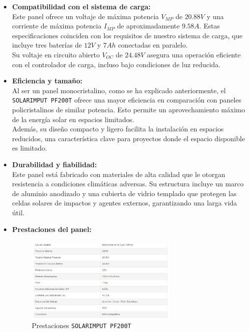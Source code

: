 \begin{itemize}
    \item \textbf{Compatibilidad con el sistema de carga:} \\
    Este panel ofrece un voltaje de máxima potencia $V_{MP}$ de $20.88 V$ y una corriente de máxima potencia $I_{MP}$  de aproximadamente $9.58 A$. Estas especificaciones coinciden con los requisitos de nuestro sistema de carga, que incluye tres baterías de $12 V$ y $7 Ah$ conectadas en paralelo. \\
    Su voltaje en circuito abierto $V_{OC}$  de $24.48 V$ asegura una operación eficiente con el controlador de carga, incluso bajo condiciones de luz reducida.

    \item \textbf{Eficiencia y tamaño:} \\
    Al ser un panel monocristalino, como se ha explicado anteriormente, el \texttt{SOLARIMPUT PF200T} ofrece una mayor eficiencia en comparación con paneles policristalinos de similar potencia. Esto permite un aprovechamiento máximo de la energía solar en espacios limitados.\\
    Además, su diseño compacto y ligero facilita la instalación en espacios reducidos, una característica clave para proyectos donde el espacio disponible es limitado.

    \item \textbf{Durabilidad y fiabilidad:}\\
    Este panel está fabricado con materiales de alta calidad que le otorgan resistencia a condiciones climáticas adversas. Su estructura incluye un marco de aluminio anodizado y una cubierta de vidrio templado que protegen las celdas solares de impactos y agentes externos, garantizando una larga vida útil.

    \item \textbf{Prestaciones del panel:}
    \begin{figure}[H]
        \centering
        \includegraphics[width=0.7\textwidth]{images/2-hardware/Panel Solar/Caracteristicas.png}
        \caption{Prestaciones \texttt{SOLARIMPUT PF200T}}
        \label{fig:4-1-1-PanelSolar}
    \end{figure}
\end{itemize}

